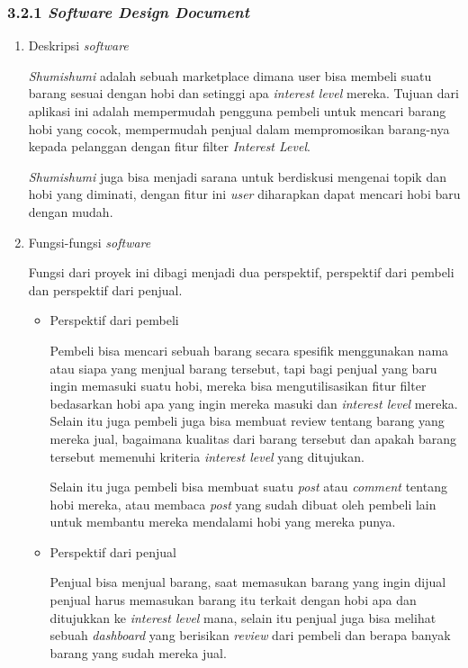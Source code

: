 \documentclass[a4paper]{article}
\begin{document}
\subsubsection*{3.2.1 \textit{Software Design Document}}
\begin{enumerate}[label=\alph*. ]
    \item Deskripsi \textit{software}

          \textit{Shumishumi} adalah sebuah marketplace dimana user bisa membeli suatu barang sesuai dengan hobi dan setinggi apa \textit{interest level} mereka. Tujuan dari aplikasi ini adalah mempermudah pengguna pembeli untuk mencari barang hobi yang cocok, mempermudah penjual dalam mempromosikan barang-nya kepada pelanggan dengan fitur filter \textit{Interest Level}.


          \textit{Shumishumi} juga bisa menjadi sarana untuk berdiskusi mengenai topik dan hobi yang diminati, dengan fitur ini \textit{user} diharapkan dapat mencari hobi baru dengan mudah.

    \item Fungsi-fungsi \textit{software}


          Fungsi dari proyek ini dibagi menjadi dua perspektif, perspektif dari pembeli dan perspektif dari penjual.
          \begin{itemize}
              \item Perspektif dari pembeli

                    Pembeli bisa mencari sebuah barang secara spesifik menggunakan nama atau siapa yang menjual barang tersebut, tapi bagi penjual yang baru ingin memasuki suatu hobi, mereka bisa mengutilisasikan fitur filter bedasarkan hobi apa yang ingin mereka masuki dan \textit{interest level} mereka. Selain itu juga pembeli juga bisa membuat review tentang barang yang mereka jual, bagaimana kualitas dari barang tersebut dan apakah barang tersebut memenuhi kriteria \textit{interest level} yang ditujukan.

                    Selain itu juga pembeli bisa membuat suatu \textit{post} atau \textit{comment} tentang hobi mereka, atau membaca \textit{post} yang sudah dibuat oleh pembeli lain untuk membantu mereka mendalami hobi yang mereka punya.

              \item Perspektif dari penjual

                    Penjual bisa menjual barang, saat memasukan barang yang ingin dijual penjual harus memasukan barang itu terkait dengan hobi apa dan ditujukkan ke \textit{interest level} mana, selain itu penjual juga bisa melihat sebuah \textit{dashboard} yang berisikan \textit{review} dari pembeli dan berapa banyak barang yang sudah mereka jual.
          \end{itemize}


\end{enumerate}
\end{document}
